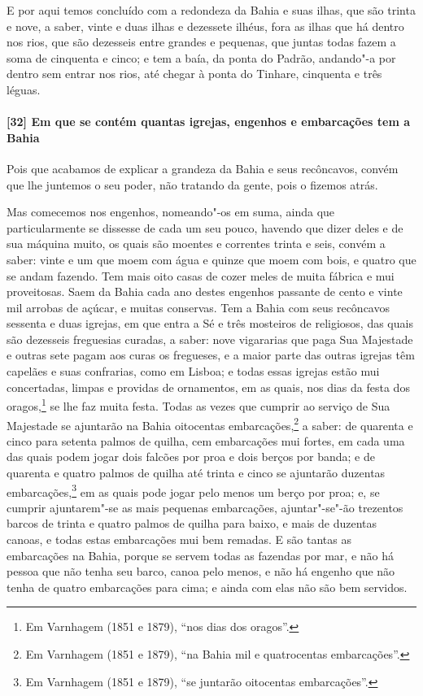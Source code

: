 E por aqui temos concluído com a redondeza da Bahia e suas ilhas, que são trinta e nove, a
saber, vinte e duas ilhas e dezessete ilhéus, fora as ilhas que há dentro nos rios, que
são dezesseis entre grandes e pequenas, que juntas todas fazem a soma de cinquenta e
cinco; e tem a baía, da ponta do Padrão, andando"-a por dentro sem entrar nos rios, até
chegar à ponta do Tinhare, cinquenta e três léguas.

\paragraph{[32] Em que se contém quantas igrejas, engenhos e embarcações tem a Bahia}\quad
Pois que acabamos de explicar a grandeza da Bahia e seus recôncavos, convém que lhe
juntemos o seu poder, não tratando da gente, pois o fizemos atrás.

Mas comecemos nos engenhos, nomeando"-os em suma, ainda que particularmente se dissesse de
cada um seu pouco, havendo que dizer deles e de sua máquina muito, os quais são moentes e
correntes trinta e seis, convém a saber: vinte e um que moem com água e quinze que moem
com bois, e quatro que se andam fazendo. Tem mais oito casas de cozer meles de muita
fábrica e mui proveitosas. Saem da Bahia cada ano destes engenhos passante de cento e
vinte mil arrobas de açúcar, e muitas conservas. Tem a Bahia com seus recôncavos sessenta
e duas igrejas, em que entra a Sé e três mosteiros de religiosos, das quais são dezesseis
freguesias curadas, a saber: nove vigararias que paga Sua Majestade e outras sete pagam
aos curas os fregueses, e a maior parte das outras igrejas têm capelães e suas confrarias,
como em Lisboa; e todas essas igrejas estão mui concertadas, limpas e providas de
ornamentos, em as quais, nos dias da festa dos oragos,\footnote{ Em Varnhagem (1851 e
1879), ``nos dias dos oragos''.} se lhe faz muita
festa. Todas as vezes que cumprir ao serviço de Sua Majestade se ajuntarão na Bahia
oitocentas embarcações,\footnote{ Em Varnhagem (1851 e 1879), ``na Bahia mil e
quatrocentas embarcações''.} a saber: de quarenta e cinco para setenta palmos de quilha,
cem embarcações mui fortes, em cada uma das quais podem jogar dois falcões por proa e dois
berços por banda; e de quarenta e quatro palmos de quilha até trinta e cinco se ajuntarão
duzentas embarcações,\footnote{ Em Varnhagem (1851 e 1879), ``se juntarão oitocentas
embarcações''.} em as quais pode jogar pelo menos um berço por proa; e, se cumprir
ajuntarem"-se as mais pequenas embarcações, ajuntar"-se"-ão trezentos barcos de trinta e
quatro palmos de quilha para baixo, e mais de duzentas canoas, e todas estas embarcações
mui bem remadas. E são tantas as embarcações na Bahia, porque se servem todas as fazendas
por mar, e não há pessoa que não tenha seu barco, canoa pelo menos, e não há engenho que
não tenha de quatro embarcações para cima; e ainda com elas não são bem servidos.

